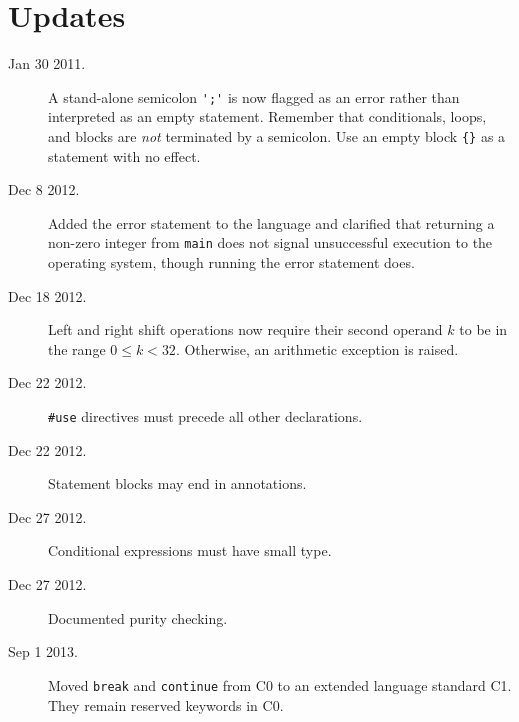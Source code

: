 \documentclass[11pt]{article}
\begin{document}
\section{Updates}
\label{sec:updates}
\hypertarget{sec:updates}{}

\begin{description}
\item[Jan 30 2011.] A stand-alone semicolon \verb"';'" is
  now flagged as an error rather than interpreted as an empty
  statement.  Remember that conditionals, loops, and blocks are
  \emph{not} terminated by a semicolon.  Use an empty block \verb'{}'
  as a statement with no effect.
\item[Dec 8 2012.] Added the error statement to the language and
  clarified that returning a non-zero integer from \verb'main' does
  not signal unsuccessful execution to the operating system, though
  running the error statement does.
\item[Dec 18 2012.] Left and right shift operations now require their
  second operand $k$ to be in the range $0 \leq k < 32$.  Otherwise,
  an arithmetic exception is raised.
\item[Dec 22 2012.] \verb'#use' directives must precede all other
  declarations.
\item[Dec 22 2012.] Statement blocks may end in annotations.
\item[Dec 27 2012.] Conditional expressions must have small type.
\item[Dec 27 2012.] Documented purity checking.
\item[Sep 1 2013.] Moved \verb'break' and \verb'continue' from
  C0 to an extended language standard C1.  They remain reserved
  keywords in C0.
\end{description}
\end{document}
